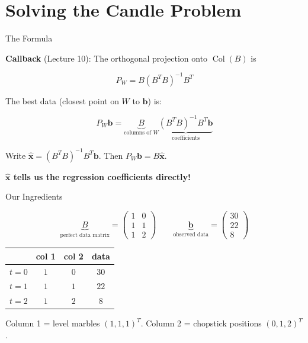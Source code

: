 \documentclass[10pt]{beamer}
\theoremstyle{definition}
\newcommand{\x}[1]{\alert{\textbf{#1}}}
\begin{document}
\section{Solving the Candle Problem}


\begin{frame}{The Formula}

\x{Callback} (Lecture 10): The orthogonal projection onto $\operatorname{Col}(B)$ is

$$P_W = B(B^TB)^{-1}B^T$$

\vspace{0.3em}

The best data (closest point on $W$ to $\mathbf{b}$) is:

$$P_W\mathbf{b} = \underbrace{B}_{\text{columns of }W} \underbrace{(B^TB)^{-1}B^T\mathbf{b}}_{\text{coefficients}}$$

\vspace{0.5em}

Write $\hat{\mathbf{x}} = (B^TB)^{-1}B^T\mathbf{b}$. Then $P_W\mathbf{b} = B\hat{\mathbf{x}}$.

\vspace{0.3em}

\x{$\hat{\mathbf{x}}$ tells us the regression coefficients directly!}

\end{frame}


\begin{frame}{Our Ingredients}

$$\underbrace{B}_{\text{perfect data matrix}} = \begin{pmatrix} 1 & 0 \\ 1 & 1 \\ 1 & 2 \end{pmatrix} \qquad \underbrace{\mathbf{b}}_{\text{observed data}} = \begin{pmatrix} 30 \\ 22 \\ 8 \end{pmatrix}$$

\vspace{0.5em}

\begin{center}
\renewcommand{\arraystretch}{1.3}
\begin{tabular}{c|cc|c}
& \small col 1 & \small col 2 & \small data \\
\hline
$t = 0$ & $1$ & $0$ & $30$ \\
$t = 1$ & $1$ & $1$ & $22$ \\
$t = 2$ & $1$ & $2$ & $8$
\end{tabular}
\end{center}

\vspace{0.3em}

Column 1 = level marbles $(1,1,1)^T$. \quad Column 2 = chopstick positions $(0,1,2)^T$.

\end{frame}
\end{document}
